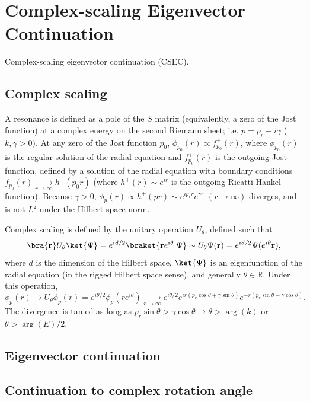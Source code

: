 \section{Complex-scaling Eigenvector Continuation}
Complex-scaling eigenvector continuation (CSEC).
\subsection{Complex scaling}
A resonance is defined as a pole of the $S$ matrix (equivalently, a zero of the Jost function) at a complex energy on the second Riemann sheet; i.e. $p=p_r -i\gamma$ ($k,\gamma > 0)$. At any zero of the Jost function $p_0$, $\phi_{p_0}(r) \propto f^+_{p_0}(r)$, where $\phi_{p_0}(r)$ is the regular solution of the radial equation and $f^+_{p_0}(r)$ is the outgoing Jost function, defined by a solution of the radial equation with boundary conditions $f^+_{p_0}(r) \xrightarrow[r\to\infty]{} h^+(p_0r)$ (where $h^+(r)\sim e^{ir}$ is the outgoing Ricatti-Hankel function). Because $\gamma >0$, $\phi_{p}(r)\propto h^+(pr)\sim e^{ip_rr}e^{\gamma r}$ $(r\to\infty)$ diverges, and is not $L^2$ under the Hilbert space norm.

Complex scaling is defined by the unitary operation $U_\theta$, defined such that
$$
    \bra{\mathbf{r}}U_\theta\ket{\Psi}=e^{id/2}\braket{\mathbf{r}e^{i\theta}|\Psi}\sim U_\theta\Psi(\mathbf{r})=e^{id/2}\Psi(e^{i\theta}\mathbf{r}),
$$
where $d$ is the dimension of the Hilbert space, $\ket{\Psi}$ is an eigenfunction of the radial equation (in the rigged Hilbert space sense), and generally $\theta\in\mathbb{R}$. Under this operation,
$$
    \phi_{p}(r)\rightarrow U_\theta\phi_p(r)=e^{i\theta/2}\phi_p(re^{i\theta})\xrightarrow[r\to\infty]{}e^{i\theta/2}e^{ir(p_r\cos\theta+\gamma\sin\theta)}e^{-r(p_r\sin\theta-\gamma\cos\theta)}.
$$
The divergence is tamed as long as $p_r\sin\theta > \gamma \cos\theta\rightarrow \theta>\arg(k)$ or $\theta > \arg(E) / 2$.
\subsection{Eigenvector continuation}
\subsection{Continuation to complex rotation angle}